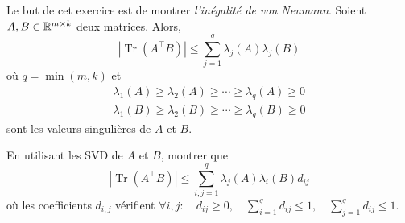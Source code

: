 \begin{exo}

 Le but de cet exercice est de montrer \textit{l'inégalité de von Neumann}. Soient
 $A, B \in \mathbb{R}^{m \times k}$ deux matrices. Alors,
 \begin{equation}\label{eq:Neumann}
  \left| \operatorname { Tr } \left( A ^ { \top } B \right) \right| \leq \sum _ { j = 1 } ^ { q } \lambda _ { j } ( A ) \lambda _ { j } ( B )
 \end{equation}
 où $q = \min ( m , k )$ et
 \begin{align}
  { \lambda _ { 1 } ( A ) \geq \lambda _ { 2 } ( A ) \geq
   \cdots \geq \lambda _ { q } ( A ) \geq 0} \label{eq:ord1} \\
  { \lambda _ { 1 } ( B ) \geq \lambda _ { 2 } ( B ) \geq \cdots \geq
  \lambda _ { q } ( B ) \geq 0 }\label{eq:ord2}
 \end{align}
 sont les valeurs singulières de $A$ et $B$.
\end{exo}

\begin{qst}

 En utilisant les SVD de $A$ et $B$, montrer que
 $$\left| \operatorname { Tr } \left( A ^ { \top } B \right) \right| \leq \sum _ { i , j = 1 } ^ { q } \lambda _ { j } ( A ) \lambda _ { i } ( B ) d _ { i j }$$
 où les coefficients $d_{i,j}$ vérifient
 $ \displaystyle \forall i , j : \quad d _ { i j } \geq 0 , \quad
  \sum _ { i = 1 } ^ { q } d _ { i j } \leq 1 , \quad \sum _ { j = 1 } ^
  { q } d _ { i j } \leq 1$.
\end{qst}

